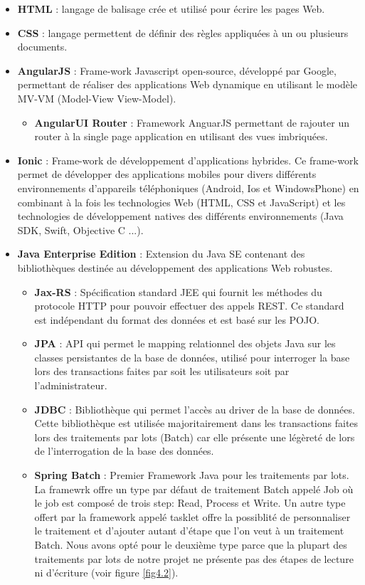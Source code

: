 \begin{itemize}
	\item \textbf{HTML} : langage de balisage crée et utilisé pour écrire les pages Web.
	\item \textbf{CSS} : langage permettent de définir des règles appliquées à un ou plusieurs documents.
	\item \textbf{AngularJS} : Frame-work Javascript open-source, développé par Google, permettant de réaliser des applications Web dynamique en utilisant le modèle MV-VM (Model-View View-Model).
	\begin{itemize}
		\item \textbf{AngularUI Router} : Framework AnguarJS permettant de rajouter un router à la single page application en utilisant des vues imbriquées.
	\end{itemize}
	\item \textbf{Ionic} : Frame-work de développement d'applications hybrides. Ce frame-work permet de développer des applications mobiles pour divers différents environnements d'appareils téléphoniques (Android, Ios et WindowsPhone) en combinant à la fois les technologies Web (HTML, CSS et JavaScript) et les technologies de développement natives des différents environnements (Java SDK, Swift, Objective C ...)\cite{3}.
	\item \textbf{Java Enterprise Edition} : Extension du Java SE contenant des bibliothèques destinée au développement des applications Web robustes.
	\begin{itemize}
		\item \textbf{Jax-RS} : Spécification standard JEE qui fournit les méthodes du protocole HTTP pour pouvoir effectuer des appels REST. Ce standard est indépendant du format des données et est basé sur les POJO.
		\item \textbf{JPA} : API qui permet le mapping relationnel des objets Java sur les classes persistantes de la base de données, utilisé pour interroger la base lors des transactions faites par soit les utilisateurs soit par l'administrateur\cite{6}.
		\item \textbf{JDBC} : Bibliothèque qui permet l'accès au driver de la base de données. Cette bibliothèque est utilisée majoritairement dans les transactions faites lors des traitements par lots (Batch) car elle présente une légèreté de lors de l'interrogation de la base des données.
		\item \textbf{Spring Batch} : Premier Framework Java pour les traitements par lots. La framewrk offre un type par défaut de traitement Batch appelé Job où le job est composé de trois step: Read, Process et Write. Un autre type offert par la framework appelé tasklet offre la possiblité de personnaliser le traitement et d'ajouter autant d'étape que l'on veut à un traitement Batch. Nous avons opté pour le deuxième type parce que la plupart des traitements par lots de notre projet ne présente pas des étapes de lecture ni d'écriture \cite{4} (voir figure \ref{fig4.2}).

\end{itemize}
\end{itemize}
